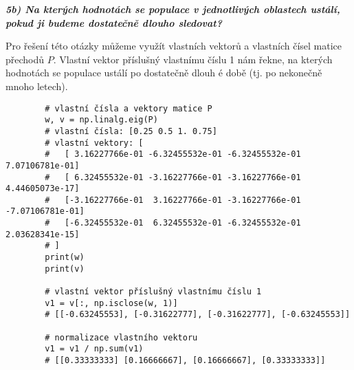\documentclass[10pt, a4paper]{ReportSheet}
\begin{document}

    \vspace{5em}

    \textbf{\textit{5b) Na kterých hodnotách se populace v jednotlivých oblastech ustálí, pokud ji budeme dostatečně
    dlouho sledovat?}}

    Pro řešení této otázky můžeme využít vlastních vektorů a vlastních čísel matice přechodů $P$.
    Vlastní vektor příslušný vlastnímu číslu 1 nám řekne, na kterých hodnotách se populace ustálí po dostatečně dlouh
    é době (tj. po nekonečně mnoho letech).
    \begin{verbatim}
        # vlastní čísla a vektory matice P
        w, v = np.linalg.eig(P)
        # vlastní čísla: [0.25 0.5 1. 0.75]
        # vlastní vektory: [
        #   [ 3.16227766e-01 -6.32455532e-01 -6.32455532e-01  7.07106781e-01]
        #   [ 6.32455532e-01 -3.16227766e-01 -3.16227766e-01  4.44605073e-17]
        #   [-3.16227766e-01  3.16227766e-01 -3.16227766e-01 -7.07106781e-01]
        #   [-6.32455532e-01  6.32455532e-01 -6.32455532e-01  2.03628341e-15]
        # ]
        print(w)
        print(v)

        # vlastní vektor příslušný vlastnímu číslu 1
        v1 = v[:, np.isclose(w, 1)]
        # [[-0.63245553], [-0.31622777], [-0.31622777], [-0.63245553]]

        # normalizace vlastního vektoru
        v1 = v1 / np.sum(v1)
        # [[0.33333333] [0.16666667], [0.16666667], [0.33333333]]
    \end{verbatim}

\end{document}
